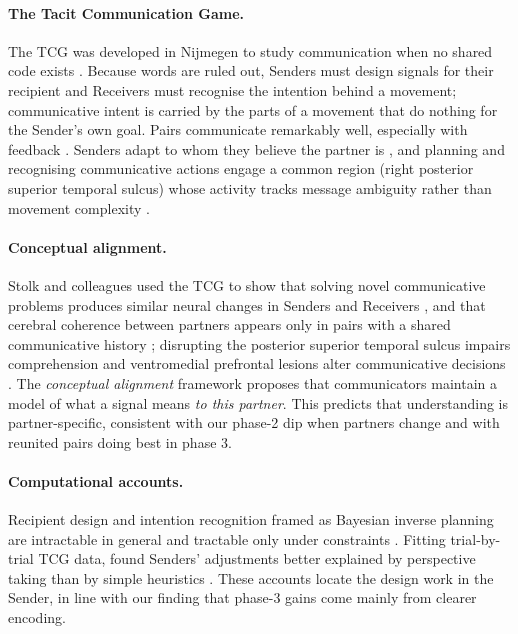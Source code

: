 \paragraph{The Tacit Communication Game.} The TCG was developed in Nijmegen to study communication when no shared code exists \citep{deruiter2010}. Because words are ruled out, Senders must design signals for their recipient and Receivers must recognise the intention behind a movement; communicative intent is carried by the parts of a movement that do nothing for the Sender's own goal. Pairs communicate remarkably well, especially with feedback \citep{deruiter2010}. Senders adapt to whom they believe the partner is \citep{newmannorlund2009}, and planning and recognising communicative actions engage a common region (right posterior superior temporal sulcus) whose activity tracks message ambiguity rather than movement complexity \citep{noordzij2009}.

\paragraph{Conceptual alignment.} Stolk and colleagues used the TCG to show that solving novel communicative problems produces similar neural changes in Senders and Receivers \citep{stolk2013}, and that cerebral coherence between partners appears only in pairs with a shared communicative history \citep{stolk2014}; disrupting the posterior superior temporal sulcus impairs comprehension \citep{stolk2014b} and ventromedial prefrontal lesions alter communicative decisions \citep{stolk2015}. The \emph{conceptual alignment} framework \citep{stolk2016} proposes that communicators maintain a model of what a signal means \emph{to this partner}. This predicts that understanding is partner-specific, consistent with our phase-2 dip when partners change and with reunited pairs doing best in phase 3.

\paragraph{Computational accounts.} Recipient design and intention recognition framed as Bayesian inverse planning are intractable in general and tractable only under constraints \citep{vanrooij2011}. Fitting trial-by-trial TCG data, \citet{blokpoel2012} found Senders' adjustments better explained by perspective taking than by simple heuristics \citep[see also][]{blokpoel2013}. These accounts locate the design work in the Sender, in line with our finding that phase-3 gains come mainly from clearer encoding.

